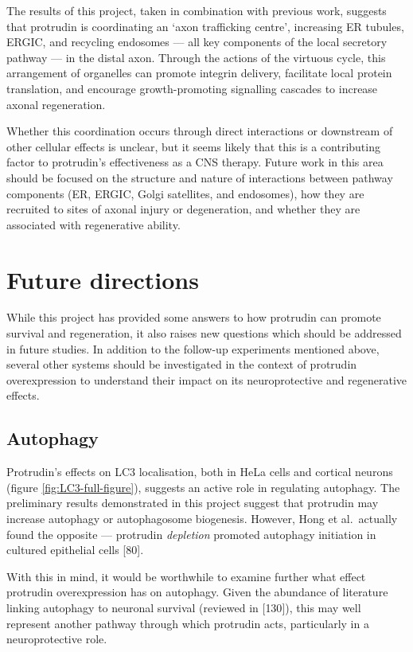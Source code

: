 \documentclass[
  12pt,
  a4paper,
]{book}
\begin{document}
The results of this project, taken in combination with previous work, suggests that protrudin is coordinating an `axon trafficking centre', increasing ER tubules, ERGIC, and recycling endosomes --- all key components of the local secretory pathway --- in the distal axon. Through the actions of the virtuous cycle, this arrangement of organelles can promote integrin delivery, facilitate local protein translation, and encourage growth-promoting signalling cascades to increase axonal regeneration.

Whether this coordination occurs through direct interactions or downstream of other cellular effects is unclear, but it seems likely that this is a contributing factor to protrudin's effectiveness as a CNS therapy. Future work in this area should be focused on the structure and nature of interactions between pathway components (ER, ERGIC, Golgi satellites, and endosomes), how they are recruited to sites of axonal injury or degeneration, and whether they are associated with regenerative ability.

\hypertarget{future-directions}{%
\section{Future directions}\label{future-directions}}

While this project has provided some answers to how protrudin can promote survival and regeneration, it also raises new questions which should be addressed in future studies. In addition to the follow-up experiments mentioned above, several other systems should be investigated in the context of protrudin overexpression to understand their impact on its neuroprotective and regenerative effects.

\hypertarget{autophagy}{%
\subsection{Autophagy}\label{autophagy}}

Protrudin's effects on LC3 localisation, both in HeLa cells and cortical neurons (figure \ref{fig:LC3-full-figure}), suggests an active role in regulating autophagy. The preliminary results demonstrated in this project suggest that protrudin may increase autophagy or autophagosome biogenesis. However, Hong et al.~actually found the opposite --- protrudin \emph{depletion} promoted autophagy initiation in cultured epithelial cells {[}80{]}.

With this in mind, it would be worthwhile to examine further what effect protrudin overexpression has on autophagy. Given the abundance of literature linking autophagy to neuronal survival (reviewed in {[}130{]}), this may well represent another pathway through which protrudin acts, particularly in a neuroprotective role.
\end{document}
